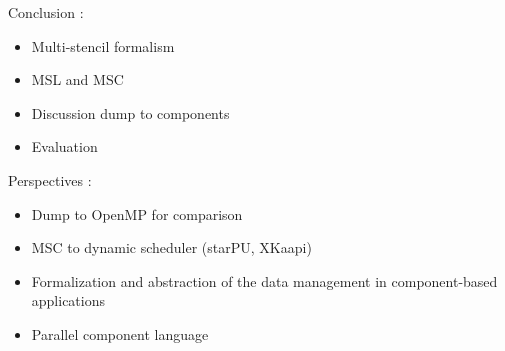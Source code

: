 Conclusion :
\begin{itemize}
\item Multi-stencil formalism
\item MSL and MSC
\item Discussion dump to components
\item Evaluation
\end{itemize}

Perspectives :
\begin{itemize}
\item Dump to OpenMP for comparison
\item MSC to dynamic scheduler (starPU, XKaapi)
\item Formalization and abstraction of the data management in component-based applications
\item Parallel component language
\end{itemize}